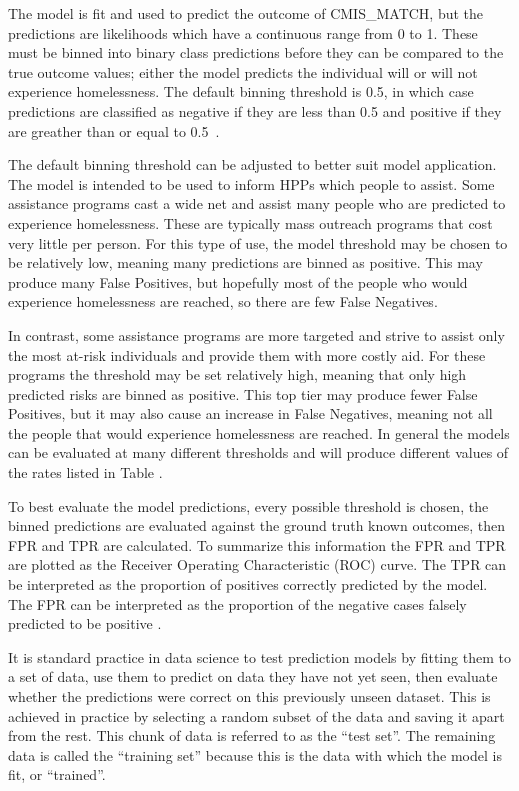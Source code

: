 \documentclass[10pt,letterpaper]{article}
\newcommand{\red}[1]{{\color{red}{#1}}}
\begin{document}
The model is fit and used to predict the outcome of CMIS\_MATCH, but the predictions are likelihoods which have a continuous range from 0 to 1. These must be binned into binary class predictions before they can be compared to the true outcome values; either the model predicts the individual will or will not experience homelessness. The default binning threshold is 0.5, in which case predictions are classified as negative if they are less than 0.5 and positive if they are greather than or equal to 0.5~\cite{bewick2005statistics}. 

The default binning threshold can be adjusted to better suit model application. The model is intended to be used to inform HPPs which people to assist. Some assistance programs cast a wide net and assist many people who are predicted to experience homelessness. These are typically mass outreach programs that cost very little per person. For this type of use, the model threshold may be chosen to be relatively low, meaning many predictions are binned as positive. This may produce many False Positives, but hopefully most of the people who would experience homelessness are reached, so there are few False Negatives. 

In contrast, some assistance programs are more targeted and strive to assist only the most at-risk individuals and provide them with more costly aid. For these programs the threshold may be set relatively high, meaning that only high predicted risks are binned as positive. This top tier may produce fewer False Positives, but it may also cause an increase in False Negatives, meaning not all the people that would experience homelessness are reached. In general the models can be evaluated at many different thresholds and will produce different values of the rates listed in Table \red{UPDATE}.

To best evaluate the model predictions, every possible threshold is chosen, the binned predictions are evaluated against the ground truth known outcomes, then FPR and TPR are calculated. To summarize this information the FPR and TPR are plotted as the Receiver Operating Characteristic (ROC) curve. The TPR can be interpreted as the proportion of positives correctly predicted by the model. The FPR can be interpreted as the proportion of the negative cases falsely predicted to be positive \cite{fawcett2006introduction}. 

It is standard practice in data science to test prediction models by fitting them to a set of data, use them to predict on data they have not yet seen, then evaluate whether the predictions were correct on this previously unseen dataset. This is achieved in practice by selecting a random subset of the data and saving it apart from the rest. This chunk of data is referred to as the ``test set''. The remaining data is called the ``training set'' because this is the data with which the model is fit, or ``trained''. 
\end{document}
